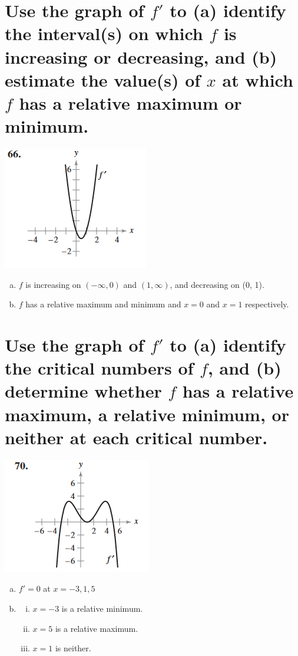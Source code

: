 \documentclass[11pt]{article}
\begin{document}
\section{Use the graph of $f'$ to (a) identify the interval(s) on which $f$ is increasing or decreasing, and (b) estimate the value(s) of $x$ at which $f$ has a relative maximum or minimum.}
\includegraphics{66.png}
\begin{enumerate}[(a)]
    \item $f$ is increasing on $(-\infty, 0)$ and $(1, \infty)$, and decreasing on (0, 1).
    \item $f$ has a relative maximum and minimum and $x=0$ and $x=1$ respectively.
\end{enumerate}

\section{Use the graph of $f'$ to (a) identify the critical numbers of $f$, and (b) determine whether $f$ has a relative maximum, a relative minimum, or neither at each critical number.}
\includegraphics{70.png}
\begin{enumerate}[(a)]
    \item $f'=0$ at $x=-3, 1, 5$
    \item \begin{enumerate}[i.]
        \item $x=-3$ is a relative minimum.
        \item $x=5$ is a relative maximum. 
        \item $x=1$ is neither. 
    \end{enumerate}
\end{enumerate}
\end{document}
